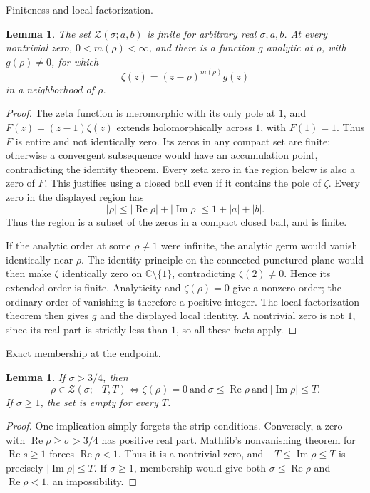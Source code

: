 \documentclass[11pt,a4paper]{article}
\numberwithin{equation}{section}
\newtheorem{lemma}[theorem]{Lemma}
\theoremstyle{definition}
\newcommand{\C}{\mathbb C}
\newcommand{\Rea}{\operatorname{Re}}
\newcommand{\Ima}{\operatorname{Im}}
\begin{document}
\par\medskip\noindent Finiteness and local factorization.
\begin{lemma}\label{lem:zeroorder}
The set $\mathcal Z(\sigma;a,b)$ is finite for arbitrary real $\sigma,a,b$.
At every nontrivial zero, $0<m(\rho)<\infty$, and there is a function $g$
analytic at $\rho$, with $g(\rho)\ne0$, for which
\[
 \zeta(z)=(z-\rho)^{m(\rho)}g(z)
\]
in a neighborhood of $\rho$.
\end{lemma}
\begin{proof}
The zeta function is meromorphic with its only pole at $1$, and
$F(z)=(z-1)\zeta(z)$ extends holomorphically across $1$, with $F(1)=1$.
Thus $F$ is entire and not identically zero. Its zeros in any compact set
are finite: otherwise a convergent subsequence would have an accumulation
point, contradicting the identity theorem. Every zeta zero in the region
below is also a zero of $F$. This justifies using a closed ball even if
it contains the pole of $\zeta$. Every zero in the displayed region has
\[
 |\rho|\le|\Rea\rho|+|\Ima\rho|\le1+|a|+|b|.
\]
Thus the region is a subset of the zeros in a compact closed ball, and is finite.

If the analytic order at some $\rho\ne1$ were infinite, the analytic germ would
vanish identically near $\rho$. The identity principle on the connected punctured
plane would then make $\zeta$ identically zero on $\C\setminus\{1\}$, contradicting
$\zeta(2)\ne0$. Hence its extended order is finite. Analyticity and
$\zeta(\rho)=0$ give a nonzero order; the ordinary order of vanishing is therefore a positive integer.
The local factorization theorem then gives $g$ and the displayed local
identity. A nontrivial zero is not $1$, since its real part is strictly less than
$1$, so all these facts apply.
\end{proof}

\par\medskip\noindent Exact membership at the endpoint.
\begin{lemma}
If $\sigma>3/4$, then
\[
 \rho\in\mathcal Z(\sigma;-T,T)
 \iff\zeta(\rho)=0\ \text{and}\ \sigma\le\Rea\rho\ \text{and}\ |\Ima\rho|\le T.
\]
If $\sigma\ge1$, the set is empty for every $T$.
\end{lemma}
\begin{proof}
One implication simply forgets the strip conditions. Conversely, a zero with
$\Rea\rho\ge\sigma>3/4$ has positive real part. Mathlib's nonvanishing theorem
for $\Rea s\ge1$ forces $\Rea\rho<1$. Thus it is a nontrivial zero, and
$-T\le\Ima\rho\le T$ is precisely $|\Ima\rho|\le T$.
If $\sigma\ge1$, membership would give both $\sigma\le\Rea\rho$ and
$\Rea\rho<1$, an impossibility.
\end{proof}
\end{document}
